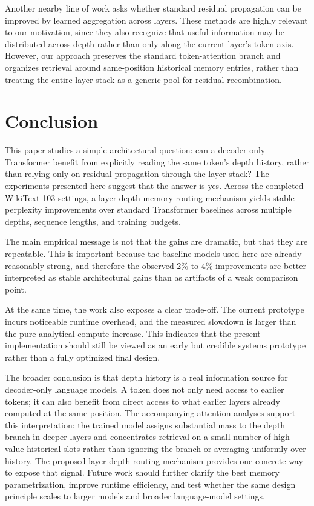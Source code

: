 \documentclass[11pt]{article}
\begin{document}
Another nearby line of work asks whether standard residual propagation can be improved by learned aggregation across layers. These methods are highly relevant to our motivation, since they also recognize that useful information may be distributed across depth rather than only along the current layer's token axis. However, our approach preserves the standard token-attention branch and organizes retrieval around same-position historical memory entries, rather than treating the entire layer stack as a generic pool for residual recombination.

\section{Conclusion}

This paper studies a simple architectural question: can a decoder-only Transformer benefit from explicitly reading the same token's depth history, rather than relying only on residual propagation through the layer stack? The experiments presented here suggest that the answer is yes. Across the completed WikiText-103 settings, a layer-depth memory routing mechanism yields stable perplexity improvements over standard Transformer baselines across multiple depths, sequence lengths, and training budgets.

The main empirical message is not that the gains are dramatic, but that they are repeatable. This is important because the baseline models used here are already reasonably strong, and therefore the observed 2\% to 4\% improvements are better interpreted as stable architectural gains than as artifacts of a weak comparison point.

At the same time, the work also exposes a clear trade-off. The current prototype incurs noticeable runtime overhead, and the measured slowdown is larger than the pure analytical compute increase. This indicates that the present implementation should still be viewed as an early but credible systems prototype rather than a fully optimized final design.

The broader conclusion is that depth history is a real information source for decoder-only language models. A token does not only need access to earlier tokens; it can also benefit from direct access to what earlier layers already computed at the same position. The accompanying attention analyses support this interpretation: the trained model assigns substantial mass to the depth branch in deeper layers and concentrates retrieval on a small number of high-value historical slots rather than ignoring the branch or averaging uniformly over history. The proposed layer-depth routing mechanism provides one concrete way to expose that signal. Future work should further clarify the best memory parametrization, improve runtime efficiency, and test whether the same design principle scales to larger models and broader language-model settings.
\end{document}
